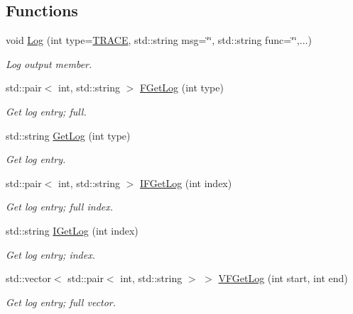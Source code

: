 \subsection*{Functions}
\begin{DoxyCompactItemize}
\item 
void \hyperlink{namespacepessum_a0eb2906e885ba2be3c2c92aa886a0e0b}{Log} (int type=\hyperlink{namespacepessum_a0e205f64abc046e94dd38be906430664a99b12a4d8b49bcebb424e72729949bed}{T\+R\+A\+CE}, std\+::string msg=\char`\"{}\char`\"{}, std\+::string func=\char`\"{}\char`\"{},...)
\begin{DoxyCompactList}\small\item\em Log output member. \end{DoxyCompactList}\item 
std\+::pair$<$ int, std\+::string $>$ \hyperlink{namespacepessum_ae7c3a2695cc96dc4f826e252d5dd4398}{F\+Get\+Log} (int type)
\begin{DoxyCompactList}\small\item\em Get log entry; full. \end{DoxyCompactList}\item 
std\+::string \hyperlink{namespacepessum_aa7ccd36394acb961bdd887f32b3572e1}{Get\+Log} (int type)
\begin{DoxyCompactList}\small\item\em Get log entry. \end{DoxyCompactList}\item 
std\+::pair$<$ int, std\+::string $>$ \hyperlink{namespacepessum_a92df65a763df879d6902d5c5c600f1d4}{I\+F\+Get\+Log} (int index)
\begin{DoxyCompactList}\small\item\em Get log entry; full index. \end{DoxyCompactList}\item 
std\+::string \hyperlink{namespacepessum_aeb38d643b26d768565f5a2c89b103f83}{I\+Get\+Log} (int index)
\begin{DoxyCompactList}\small\item\em Get log entry; index. \end{DoxyCompactList}\item 
std\+::vector$<$ std\+::pair$<$ int, std\+::string $>$ $>$ \hyperlink{namespacepessum_a32367e906bdf84c0942a5e4a3588b255}{V\+F\+Get\+Log} (int start, int end)
\begin{DoxyCompactList}\small\item\em Get log entry; full vector. \end{DoxyCompactList}\item 

\end{DoxyCompactItemize}
